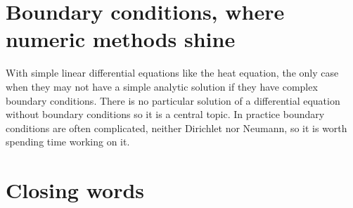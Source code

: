 \documentclass[pdftex,12pt,a4paper]{article}
\begin{document}
	\section{Boundary conditions, where numeric methods shine}
		With simple linear differential equations like the heat equation, the only case when they may not have a simple analytic solution if they have complex boundary conditions. There is no particular solution of a differential equation without boundary conditions so it is a central topic. In practice boundary conditions are often complicated, neither Dirichlet nor Neumann, so it is worth spending time working on it.
		
		
	\section{Closing words}
		
	
    
\end{document}
